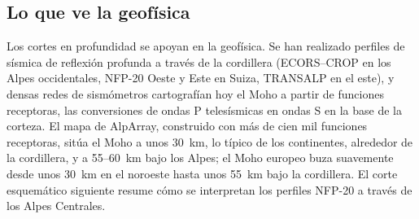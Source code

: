 \subsection*{Lo que ve la geofísica}

Los cortes en profundidad se apoyan en la geofísica. Se han realizado perfiles de sísmica de reflexión profunda
a través de la cordillera (ECORS--CROP en los Alpes occidentales, NFP-20 Oeste y Este en
Suiza, TRANSALP en el este), y densas redes de sismómetros cartografían hoy el Moho
a partir de funciones receptoras, las conversiones de ondas P telesísmicas en ondas S en la base de
la corteza. El mapa de AlpArray, construido con más de cien mil funciones receptoras,
sitúa el Moho a unos \qty{30}{km}, lo típico de los continentes, alrededor de la cordillera, y a 55--\qty{60}{km}
bajo los Alpes; el Moho europeo buza suavemente desde unos \qty{30}{km} en el
noroeste hasta unos \qty{55}{km} bajo la cordillera.
El corte esquemático siguiente resume cómo se interpretan los perfiles NFP-20 a través de los Alpes
Centrales.

